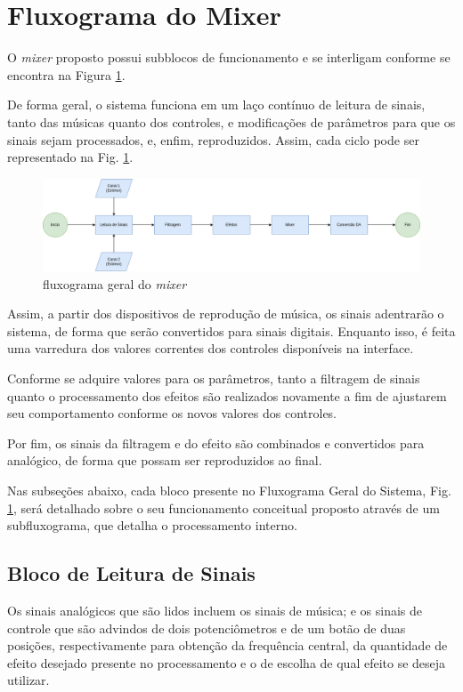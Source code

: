 \section{Fluxograma do Mixer}

O \textit{mixer} proposto possui subblocos de funcionamento e se interligam conforme se encontra na Figura \ref{fig52}.

De forma geral, o sistema funciona em um laço contínuo de leitura de sinais, tanto das músicas quanto dos controles, e modificações de parâmetros para que os sinais sejam processados, e, enfim, reproduzidos. Assim, cada ciclo pode ser representado na Fig. \ref{fig52}.

\begin{figure}[h]
    \centering
    \includegraphics[width=\textwidth]{figuras/fig52.png}
    \caption{fluxograma geral do \textit{mixer}}
    \label{fig52}
\end{figure}

Assim, a partir dos dispositivos de reprodução de música, os sinais adentrarão o sistema, de forma que serão convertidos para sinais digitais. Enquanto isso, é feita uma varredura dos valores correntes dos controles disponíveis na interface.

Conforme se adquire valores para os parâmetros, tanto a filtragem de sinais quanto o processamento dos efeitos são realizados novamente a fim de ajustarem seu comportamento conforme os novos valores dos controles.

Por fim, os sinais da filtragem e do efeito são combinados e convertidos para analógico, de forma que possam ser reproduzidos ao final.

Nas subseções abaixo, cada bloco presente no Fluxograma Geral do Sistema, Fig. \ref{fig52}, será detalhado sobre o seu funcionamento conceitual proposto através de um subfluxograma, que detalha o processamento interno.

\subsection{Bloco de Leitura de Sinais}

Os sinais analógicos que são lidos incluem os sinais de música; e os sinais de controle que são advindos de dois potenciômetros e de um botão de duas posições, respectivamente para obtenção da frequência central, da quantidade de efeito desejado presente no processamento e o de escolha de qual efeito se deseja utilizar. 

